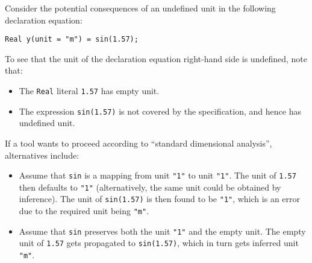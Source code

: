 \begin{example}
Consider the potential consequences of an undefined unit in the following declaration equation:
\begin{lstlisting}[language=modelica]
Real y(unit = "m") = sin(1.57);
\end{lstlisting}
To see that the unit of the declaration equation right-hand side is undefined, note that:
\begin{itemize}
\item The \lstinline!Real! literal \lstinline!1.57! has empty unit.
\item The expression \lstinline!sin(1.57)! is not covered by the specification, and hence has undefined unit.
\end{itemize}
If a tool wants to proceed according to ``standard dimensional analysis'', alternatives include:
\begin{itemize}
\item
  Assume that \lstinline!sin! is a mapping from unit \lstinline!"1"! to unit \lstinline!"1"!.
  The unit of \lstinline!1.57! then defaults to \lstinline!"1"! (alternatively, the same unit could be obtained by inference).
  The unit of \lstinline!sin(1.57)! is then found to be \lstinline!"1"!, which is an error due to the required unit being \lstinline!"m"!.
\item
  Assume that \lstinline!sin! preserves both the unit \lstinline!"1"! and the empty unit.
  The empty unit of \lstinline!1.57! gets propagated to \lstinline!sin(1.57)!, which in turn gets inferred unit \lstinline!"m"!.
\end{itemize}
\end{example}
